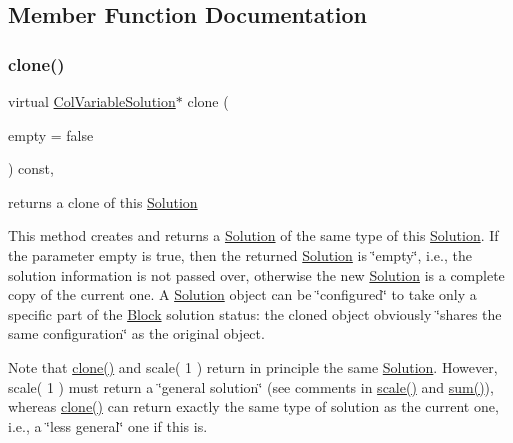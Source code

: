 \subsection{Member Function Documentation}
\mbox{\label{class_s_m_spp__di__unipi__it_1_1_col_variable_solution_a3088fd7540cc9da5a5539a4c9deea8ea}} 
\subsubsection{\texorpdfstring{clone()}{clone()}}
{\footnotesize\ttfamily virtual \mbox{\hyperlink{class_s_m_spp__di__unipi__it_1_1_col_variable_solution}{Col\+Variable\+Solution}}$\ast$ clone (\begin{DoxyParamCaption}\item[{bool}]{empty = {\ttfamily false} }\end{DoxyParamCaption}) const\hspace{0.3cm}{\ttfamily [override]}, {\ttfamily [virtual]}}



returns a clone of this \mbox{\hyperlink{class_s_m_spp__di__unipi__it_1_1_solution}{Solution}} 

This method creates and returns a \mbox{\hyperlink{class_s_m_spp__di__unipi__it_1_1_solution}{Solution}} of the same type of this \mbox{\hyperlink{class_s_m_spp__di__unipi__it_1_1_solution}{Solution}}. If the parameter empty is true, then the returned \mbox{\hyperlink{class_s_m_spp__di__unipi__it_1_1_solution}{Solution}} is \char`\"{}empty\char`\"{}, i.\+e., the solution information is not passed over, otherwise the new \mbox{\hyperlink{class_s_m_spp__di__unipi__it_1_1_solution}{Solution}} is a complete copy of the current one. A \mbox{\hyperlink{class_s_m_spp__di__unipi__it_1_1_solution}{Solution}} object can be \char`\"{}configured\char`\"{} to take only a specific part of the \mbox{\hyperlink{class_s_m_spp__di__unipi__it_1_1_block}{Block}} solution status\+: the cloned object obviously \char`\"{}shares the same configuration\char`\"{} as the original object.

Note that \mbox{\hyperlink{class_s_m_spp__di__unipi__it_1_1_col_variable_solution_a3088fd7540cc9da5a5539a4c9deea8ea}{clone()}} and scale( 1 ) return in principle the same \mbox{\hyperlink{class_s_m_spp__di__unipi__it_1_1_solution}{Solution}}. However, scale( 1 ) must return a \char`\"{}general solution\char`\"{} (see comments in \mbox{\hyperlink{class_s_m_spp__di__unipi__it_1_1_col_variable_solution_ae540e7cdfd7d10111ae795606dfa58e2}{scale()}} and \mbox{\hyperlink{class_s_m_spp__di__unipi__it_1_1_col_variable_solution_abf263a2361d4099d9fe7fd4cddc7f7ec}{sum()}}), whereas \mbox{\hyperlink{class_s_m_spp__di__unipi__it_1_1_col_variable_solution_a3088fd7540cc9da5a5539a4c9deea8ea}{clone()}} can return exactly the same type of solution as the current one, i.\+e., a \char`\"{}less general\char`\"{} one if this is. 

